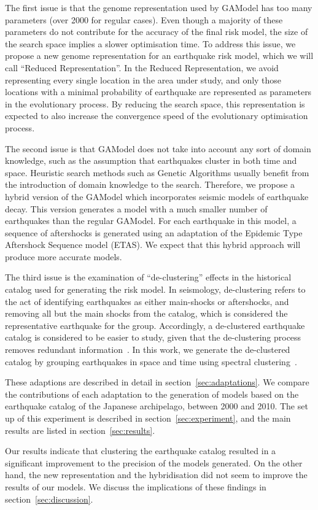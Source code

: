 The first issue is that the genome representation used by GAModel has
too many parameters (over 2000 for regular cases). Even though a
majority of these parameters do not contribute for the accuracy of the
final risk model, the size of the search space implies a slower
optimisation time. To address this issue, we propose a new genome
representation for an earthquake risk model, which we will call
``Reduced Representation''. In the Reduced Representation, we avoid
representing every single location in the area under study, and only
those locations with a minimal probability of earthquake are
represented as parameters in the evolutionary process. By reducing the
search space, this representation is expected to also increase the
convergence speed of the evolutionary optimisation process.

The second issue is that GAModel does not take into account any sort
of domain knowledge, such as the assumption that earthquakes cluster
in both time and space. Heuristic search methods such as Genetic
Algorithms usually benefit from the introduction of domain knowledge
to the search. Therefore, we propose a hybrid version of the GAModel
which incorporates seismic models of earthquake decay. This version
generates a model with a much smaller number of earthquakes than the
regular GAModel. For each earthquake in this model, a sequence of
aftershocks is generated using an adaptation of the Epidemic Type
Aftershock Sequence model (ETAS). We expect that this hybrid approach
will produce more accurate models.

The third issue is the examination of ``de-clustering'' effects in the
historical catalog used for generating the risk model. In seismology,
de-clustering refers to the act of identifying earthquakes as either
main-shocks or aftershocks, and removing all but the main shocks from
the catalog, which is considered the representative earthquake for the
group. Accordingly, a de-clustered earthquake catalog is considered to
be easier to study, given that the de-clustering process removes
redundant information~\cite{van2012seismicity}. In this work, we
generate the de-clustered catalog by grouping earthquakes in space and
time using spectral clustering~\cite{spectral_tutorial}.

These adaptions are described in detail in
section~\ref{sec:adaptations}. We compare the contributions of each
adaptation to the generation of models based on the earthquake catalog
of the Japanese archipelago, between 2000 and 2010. The set up of this
experiment is described in section~\ref{sec:experiment},
and the main results are listed in section~\ref{sec:results}.

Our results indicate that clustering the earthquake catalog resulted
in a significant improvement to the precision of the models
generated. On the other hand, the new representation and the
hybridisation did not seem to improve the results of our models. We
discuss the implications of these findings in
section~\ref{sec:discussion}.

